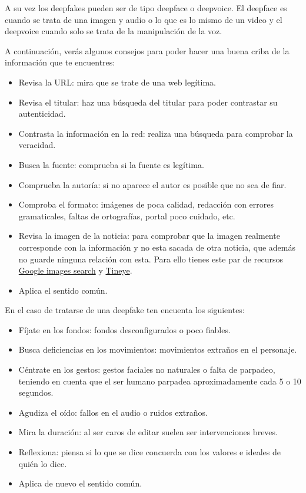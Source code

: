 \documentclass[
  a4paper,
  openany]{book}
\begin{document}
A su vez los deepfakes pueden ser de tipo deepface o deepvoice. El deepface es cuando se trata de una imagen y audio o lo que es lo mismo de un video y el deepvoice cuando solo se trata de la manipulación de la voz.

A continuación, verás algunos consejos para poder hacer una buena criba de la información que te encuentres:

\begin{itemize}
\item
  Revisa la URL: mira que se trate de una web legítima.
\item
  Revisa el titular: haz una búsqueda del titular para poder contrastar su autenticidad.
\item
  Contrasta la información en la red: realiza una búsqueda para comprobar la veracidad.
\item
  Busca la fuente: comprueba si la fuente es legítima.
\item
  Comprueba la autoría: si no aparece el autor es posible que no sea de fiar.
\item
  Comproba el formato: imágenes de poca calidad, redacción con errores gramaticales, faltas de ortografías, portal poco cuidado, etc.
\item
  Revisa la imagen de la noticia: para comprobar que la imagen realmente corresponde con la información y no esta sacada de otra noticia, que además no guarde ninguna relación con esta. Para ello tienes este par de recursos \href{https://www.google.es/imghp?hl=es}{Google images search} y \href{https://tineye.com/}{Tineye}.
\item
  Aplica el sentido común.
\end{itemize}

En el caso de tratarse de una deepfake ten encuenta los siguientes:

\begin{itemize}
\item
  Fíjate en los fondos: fondos desconfigurados o poco fiables.
\item
  Busca deficiencias en los movimientos: movimientos extraños en el personaje.
\item
  Céntrate en los gestos: gestos faciales no naturales o falta de parpadeo, teniendo en cuenta que el ser humano parpadea aproximadamente cada 5 o 10 segundos.
\item
  Agudiza el oído: fallos en el audio o ruidos extraños.
\item
  Mira la duración: al ser caros de editar suelen ser intervenciones breves.
\item
  Reflexiona: piensa si lo que se dice concuerda con los valores e ideales de quién lo dice.
\item
  Aplica de nuevo el sentido común.
\end{itemize}
\end{document}
